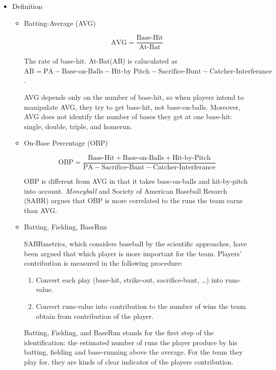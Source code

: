 \documentclass[dvipdfmx, 12pt]{article}
\begin{document}
\begin{itemize}
  \item Definition

  \begin{itemize}
    \item Batting-Average (AVG)

    \[
    \text{AVG} = \dfrac{\text{Base-Hit}}{\text{At-Bat}}
    \]

    The rate of base-hit. At-Bat(AB) is caluculated as $\text{AB} = \text{PA} - \text{Base-on-Balls} - \text{Hit-by Pitch} - \text{Sacrifice-Bunt} - \text{Catcher-Interferance}$.

    AVG depends only on the number of base-hit, so when players intend to manipulate AVG, they try to get base-hit, not base-on-balls. Moreover, AVG does not identify the number of bases they get at one base-hit: single, double, triple, and homerun.

    \item On-Base Percentage (OBP)

    \[
    \text{OBP} = \dfrac{\text{Base-Hit} + \text{Base-on-Balls} + \text{Hit-by-Pitch}}{\text{PA} - \text{Sacrifice-Bunt} - \text{Catcher-Interferance}}
    \]

    OBP is different from AVG in that it takes base-on-balls and hit-by-pitch into account. \textit{Moneyball} and Society of American Baseball Resarch (SABR) argues that OBP is more correlated to the runs the team earns than AVG.

    \item Batting, Fielding, BaseRun

    SABRmetrics, which considers baseball by the scientific approaches, have been argued that which player is more important for the team. Players' contribution is measured in the following procedure:

    \begin{enumerate}
      \item Convert each play (base-hit, strike-out, sacrifice-bunt, \ldots) into runs-value.

      \item Convert runs-value into contribution to the number of wins the team obtain from contribution of the player.
    \end{enumerate}

    Batting, Fielding, and BaseRun stands for the first step of the identification: the estimated number of runs the player produce by his batting, fielding and base-running above the average. For the team they play for, they are kinds of clear indicator of the players contribution.


\end{itemize}
\end{itemize}
\end{document}
